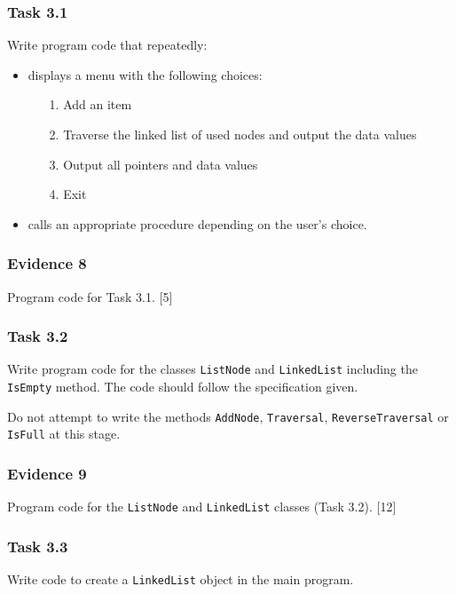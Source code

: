 \subsubsection*{Task 3.1}

Write program code that repeatedly:
\begin{itemize}
\item displays a menu with the following choices: 
\begin{enumerate}
\item[1.]  Add an item 
\item[2.]  Traverse the linked list of used nodes and output the data values 
\item[3.]  Output all pointers and data values 
\item[4.]  Exit 
\end{enumerate}
\item calls an appropriate procedure depending on the user's choice. 
\end{itemize}

\subsubsection*{Evidence 8}

Program code for Task 3.1.\hfill{} {[}5{]}

\subsubsection*{Task 3.2}

Write program code for the classes \texttt{ListNode} and \texttt{LinkedList}
including the \texttt{IsEmpty} method. The code should follow the
specification given. 

Do not attempt to write the methods \texttt{AddNode}, \texttt{Traversal},
\texttt{ReverseTraversal} or \texttt{IsFull} at this stage. 

\subsubsection*{Evidence 9}

Program code for the \texttt{ListNode} and \texttt{LinkedList} classes
(Task 3.2).\hfill{} {[}12{]}

\subsubsection*{Task 3.3}

Write code to create a \texttt{LinkedList} object in the main program.

